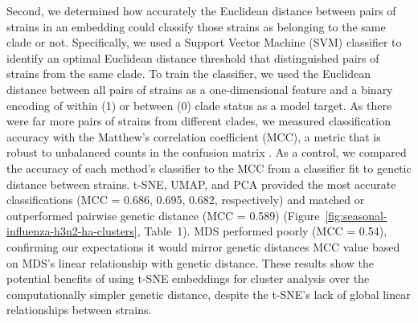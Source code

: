 \documentclass[9pt,lineno]{elife}
\begin{document}
Second, we determined how accurately the Euclidean distance between pairs of strains in an embedding could classify those strains as belonging to the same clade or not.
Specifically, we used a Support Vector Machine (SVM) classifier to identify an optimal Euclidean distance threshold that distinguished pairs of strains from the same clade.
To train the classifier, we used the Euclidean distance between all pairs of strains as a one-dimensional feature and a binary encoding of within (1) or between (0) clade status as a model target.
As there were far more pairs of strains from different clades, we measured classification accuracy with the Matthew's correlation coefficient (MCC), a metric that is robust to unbalanced counts in the confusion matrix \citep{matthews_1975}.
As a control, we compared the accuracy of each method's classifier to the MCC from a classifier fit to genetic distance between strains.
t-SNE, UMAP, and PCA provided the most accurate classifications (MCC = 0.686, 0.695, 0.682, respectively) and matched or outperformed pairwise genetic distance (MCC = 0.589) (Figure~\ref{fig:seasonal-influenza-h3n2-ha-clusters}, Table~1).
MDS performed poorly (MCC = 0.54), confirming our expectations it would mirror genetic distances MCC value based on MDS's linear relationship with genetic distance.
These results show the potential benefits of using t-SNE embeddings for cluster analysis over the computationally simpler genetic distance, despite the t-SNE's lack of global linear relationships between strains.
\end{document}
